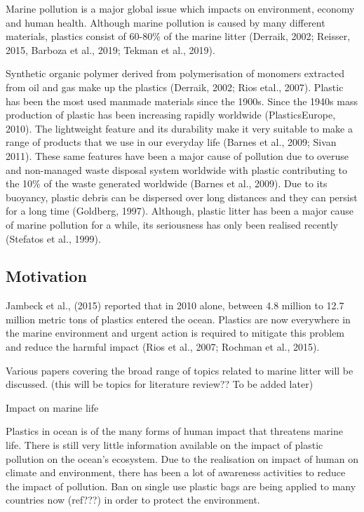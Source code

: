 \documentclass[10pt]{article}\usepackage[]{graphicx}\usepackage[]{color}
\begin{document}
Marine pollution is a major global issue which impacts on environment, economy and human health. Although marine pollution is caused by many different materials, plastics consist of 60-80\% of the marine litter (Derraik, 2002; Reisser, 2015, Barboza et al., 2019; Tekman et al., 2019). 

Synthetic organic polymer derived from polymerisation of monomers extracted from oil and gas make up the plastics (Derraik, 2002; Rios etal., 2007). Plastic has been the most used manmade materials since the 1900s. Since the 1940s mass production of plastic has been increasing rapidly worldwide (PlasticsEurope, 2010). The lightweight feature and its durability make it very suitable to make a range of products that we use in our everyday life (Barnes et al., 2009; Sivan 2011). These same features have been a major cause of pollution due to overuse and non-managed waste disposal system worldwide with plastic contributing to the 10\% of the waste generated worldwide (Barnes et al., 2009). Due to its buoyancy, plastic debris can be dispersed over long distances and they can persist for a long time (Goldberg, 1997). Although, plastic litter has been a major cause of marine pollution for a while, its seriousness has only been realised recently (Stefatos et al., 1999). 


\subsection{Motivation}\label{mot}
Jambeck et al., (2015) reported that in 2010 alone, between 4.8 million to 12.7 million metric tons of plastics entered the ocean. Plastics are now everywhere in the marine environment and urgent action is required to mitigate this problem and reduce the harmful impact (Rios et al., 2007; Rochman et al., 2015). 

Various papers covering the broad range of topics related to marine litter will be discussed. (this will be topics for literature review?? To be added later)

Impact on marine life

Plastics in ocean is of the many forms of human impact that threatens marine life. There is still very little information available on the impact of plastic pollution on the ocean's ecosystem. Due to the realisation on impact of human on climate and environment, there has been a lot of awareness activities to reduce the impact of pollution. Ban on single use plastic bags are being applied to many countries now (ref???) in order to protect the environment. 
\end{document}
